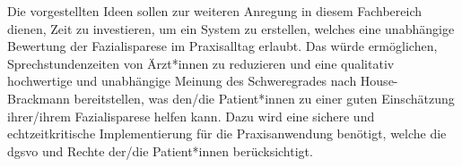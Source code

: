 \vspace{1cm}
Die vorgestellten Ideen sollen zur weiteren Anregung in diesem Fachbereich dienen, Zeit zu investieren, um ein System zu erstellen, welches eine unabhängige Bewertung der Fazialisparese im Praxisalltag erlaubt. Das würde ermöglichen, Sprechstundenzeiten von Ärzt*innen zu reduzieren und eine qualitativ hochwertige und unabhängige Meinung des Schweregrades nach House-Brackmann bereitstellen, was den/die Patient*innen zu einer guten Einschätzung ihrer/ihrem Fazialisparese helfen kann. Dazu wird eine sichere und echtzeitkritische Implementierung für die Praxisanwendung benötigt, welche die \ac{dgsvo} und Rechte der/die Patient*innen berücksichtigt.
